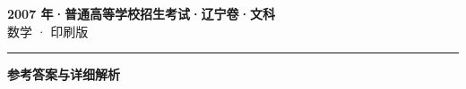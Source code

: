 \documentclass[zihao=5, a4paper]{ctexart}
\begin{document}
\begin{center}
  {\Large\bfseries 2007 年·普通高等学校招生考试·辽宁卷·文科}\\[4pt]
  {\large 数学 · 印刷版}
\end{center}
\medskip
{}

\par\bigskip\hrule\bigskip
{}
\begin{center}{\large\bfseries 参考答案与详细解析}\end{center}
\smallskip

\end{document}
